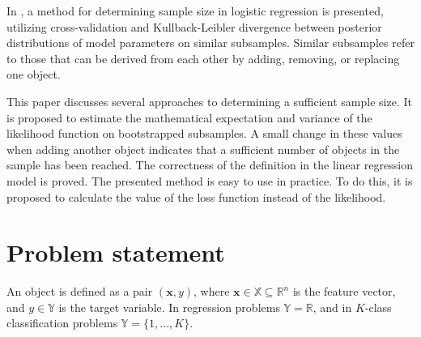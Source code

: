 \documentclass[runningheads]{llncs}
\begin{document}
In \cite{MOTRENKO2014743}, a method for determining sample size in logistic regression is presented, utilizing cross-validation and Kullback-Leibler divergence between posterior distributions of model parameters on similar subsamples. Similar subsamples refer to those that can be derived from each other by adding, removing, or replacing one object.


This paper discusses several approaches to determining a sufficient sample size. It is proposed to estimate the mathematical expectation and variance of the likelihood function on bootstrapped subsamples. A small change in these values when adding another object indicates that a sufficient number of objects in the sample has been reached. The correctness of the definition in the linear regression model is proved. The presented method is easy to use in practice. To do this, it is proposed to calculate the value of the loss function instead of the likelihood. 

\section{Problem statement}
An object is defined as a pair $(\mathbf{x}, y)$, where $\mathbf{x} \in \mathbb{X} \subseteq \mathbb{R}^n$ is the feature vector, and $y \in \mathbb{Y}$ is the target variable. In regression problems $\mathbb{Y} = \mathbb{R}$, and in $K$-class classification problems $\mathbb{Y} = \{1, \ldots, K\}$.
\end{document}
